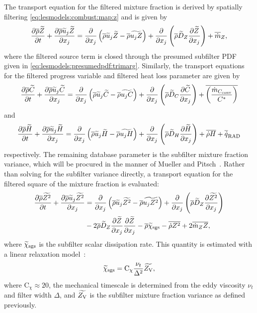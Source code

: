 The transport equation for the filtered mixture fraction is derived by spatially filtering \cref{eq:lesmodels:combust:map:z} and is given by
\begin{equation}\label{eq:lesmodels:presumedpdf:filteredz}
  \ftrder{\tf{Z}} = \dsff[\tf{Z}]{\tf{u_j Z}} + \fdt[Z]{\tf{Z}} + \fst[m]{Z},
\end{equation}
where the filtered source term is closed through the presumed subfilter PDF given in \cref{eq:lesmodels:presumedpdf:trimarg}. Similarly, the transport equations for the filtered progress variable and filtered heat loss parameter are given by
\begin{equation}\label{eq:lesmodels:presumedpdf:filteredc}
  \ftrder{\tf{C}} = \dsff[\tf{C}]{\tf{u_j C}} + \fdt[C]{\tf{C}} + \mean{\left( \frac{\dot{m}_{C_{\text{conv}}}}{C^*} \right)}
\end{equation}
and
\begin{equation}\label{eq:lesmodels:presumedpdf:filteredh}
  \ftrder{\tf{H}} = \dsff[\tf{H}]{\tf{u_j H}} + \fdt[H]{\tf{H}} + \mean{\dot{\rho}H} + \fst[q]{\text{RAD}}
\end{equation}
respectively. The remaining database parameter is the subfilter mixture fraction variance, which will be procured in the manner of Mueller and Pitsch~\cite{mueller2012}. Rather than solving for the subfilter variance directly, a transport equation for the filtered square of the mixture fraction is evaluated:
\begin{equation}\label{eq:lesmodels:presumedpdf:filteredzsq}
  \begin{split}
    \ftrder{\tf{Z^2}} &= \dsff[\tf{Z^2}]{\tf{u_j Z^2}} + \fdt[Z]{\tf{Z^2}} \\
    &- 2\mean{\rho}\tf{D}_Z \pder[\tf{Z}]{x_j}\pder[\tf{Z}]{x_j} - \mean{\rho}\tf{\chi}_{\text{sgs}} - \mean{\dot{\rho}Z^2} + 2\mean{\dot{m}_Z Z},
  \end{split}
\end{equation}
where $\tf{\chi}_{\text{sgs}}$ is the subfilter scalar dissipation rate. This quantity is estimated with a linear relaxation model~\cite{ihme200890}:
\begin{equation}\label{eq:lesmodels:presumedpdf:chisgs}
  \tf{\chi}_{\text{sgs}} = \text{C}_{\chi}\frac{\nu_t}{\Delta^2}\tf{Z_{\text{V}}},
\end{equation}
where $\text{C}_{\chi} \approx 20$, the mechanical timescale is determined from the eddy viscosity $\nu_t$ and filter width $\Delta$, and $\tf{Z_{\text{V}}}$ is the subfilter mixture fraction variance as defined previously.
